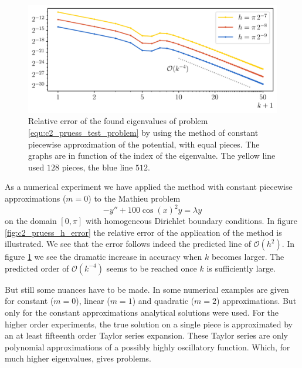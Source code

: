 \begin{figure}
    \begin{center}
        \includegraphics[width=\textwidth]{img/chapter2/pruess_k_error.pdf}
    \end{center}
    \caption{Relative error of the found eigenvalues of problem \eqref{equ:c2_pruess_test_problem} by using the method of constant piecewise approximation of the potential, with equal pieces. The graphs are in function of the index of the eigenvalue. The yellow line used $128$ pieces, the blue line $512$.}
    \label{fig:c2_pruess_k_error}
\end{figure}

As a numerical experiment we have applied the method with constant piecewise approximations ($m=0$) to the Mathieu problem
\begin{equation}\label{equ:c2_pruess_test_problem}
    -y'' + 100 \cos(x)^2 y = \lambda y
\end{equation}
on the domain $[0, \pi]$ with homogeneous Dirichlet boundary conditions. In figure \ref{fig:c2_pruess_h_error} the relative error of the application of the method is illustrated. We see that the error follows indeed the predicted line of $\mathcal{O}(h^2)$. In figure \ref{fig:c2_pruess_k_error} we see the dramatic increase in accuracy when $k$ becomes larger. The predicted order of $\mathcal{O}(k^{-4})$ seems to be reached once $k$ is sufficiently large.


But still some nuances have to be made. In \cite{pruess_estimating_1973} some numerical examples are given for constant ($m=0$), linear ($m=1$) and quadratic ($m=2$) approximations. But only for the constant approximations analytical solutions were used. For the higher order experiments, the true solution on a single piece is approximated by an at least fifteenth order Taylor series expansion. These Taylor series are only polynomial approximations of a possibly highly oscillatory function. Which, for much higher eigenvalues, gives problems.

